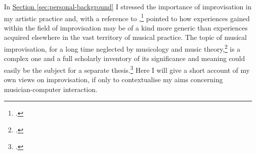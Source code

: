 In \hyperref[sec:personal-background]{Section \ref*{sec:personal-background}} I stressed the importance of improvisation in my artistic practice and, with a reference to \citeauthor{benson03},\footcite{benson03} pointed to how experiences gained within the field of improvisation may be of a kind more generic than experiences acquired elsewhere in the vast territory of musical practice. The topic of musical improvisation, for a long time neglected by musicology and music theory,\footcites()()[See, for example,][]{lewis-1}[With regard to improvisation all contributions in the collection are of interest, but regarding the scholarly neglect of improvisation in particular, see][]{nettl98:2}[see also the introduction to][]{bailey92} is a complex one and a full scholarly inventory of its significance and meaning could easily be the subject for a separate thesis.\footcite[Although I tend to agree with Bailey that it is doubtful whether it is at all possible to \emph{describe} improvisation (``for there is something central to the spirit of voluntary improvisation which is opposed to the aims and contradicts the idea of documentation''), there are also non-descriptive and non-documenting ways to do this inventory.][\pno ix]{bailey92} Here I will give a short account of my own views on improvisation, if only to contextualise my aims concerning musician-computer interaction.

